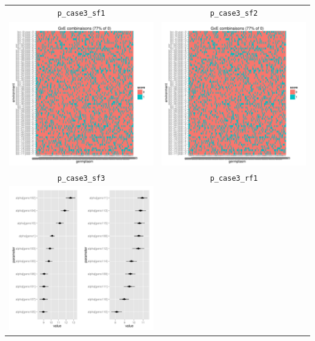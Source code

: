 \documentclass{book}\usepackage[]{graphicx}\usepackage[]{color}
\newenvironment{knitrout}{}{} %
\begin{document}
\begin{center}
\begin{tabular}{cc}
\texttt{p\_case3\_sf1} & \texttt{p\_case3\_sf2} \\
\begin{knitrout}
\definecolor{shadecolor}{rgb}{0.969, 0.969, 0.969}\color{fgcolor}

{\centering \includegraphics[width=.4\textwidth]{figures/PPBstats_unnamed-chunk-32-1} 

}



\end{knitrout}
&
\begin{knitrout}
\definecolor{shadecolor}{rgb}{0.969, 0.969, 0.969}\color{fgcolor}

{\centering \includegraphics[width=.4\textwidth]{figures/PPBstats_unnamed-chunk-33-1} 

}



\end{knitrout}
\\
\texttt{p\_case3\_sf3} & \texttt{p\_case3\_rf1} \\
\begin{knitrout}
\definecolor{shadecolor}{rgb}{0.969, 0.969, 0.969}\color{fgcolor}

{\centering \includegraphics[width=.4\textwidth]{figures/PPBstats_unnamed-chunk-34-1} 

}
\end{knitrout}
\end{tabular}
\end{center}
\end{document}
